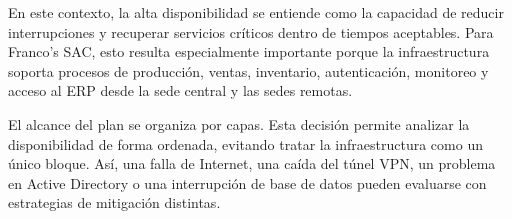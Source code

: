 \documentclass[11pt, a4paper, oneside]{report}
\begin{document}
En este contexto, la alta disponibilidad se entiende como la capacidad de reducir interrupciones y recuperar servicios críticos dentro de tiempos aceptables. Para Franco's SAC, esto resulta especialmente importante porque la infraestructura soporta procesos de producción, ventas, inventario, autenticación, monitoreo y acceso al ERP desde la sede central y las sedes remotas.

El alcance del plan se organiza por capas. Esta decisión permite analizar la disponibilidad de forma ordenada, evitando tratar la infraestructura como un único bloque. Así, una falla de Internet, una caída del túnel VPN, un problema en Active Directory o una interrupción de base de datos pueden evaluarse con estrategias de mitigación distintas.

\renewcommand{\arraystretch}{1.3}
\footnotesize
{}
\end{document}
